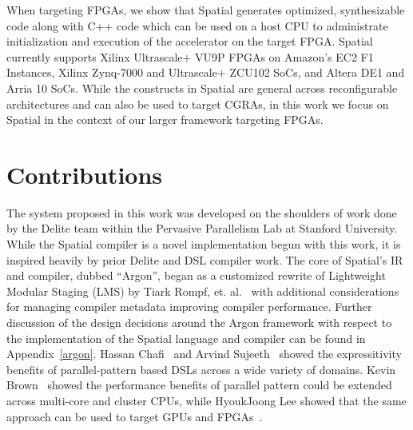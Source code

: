 When targeting FPGAs, we show that Spatial generates optimized, synthesizable
code along with C++ code which can be used on a host CPU to administrate
initialization and execution of the accelerator on the target FPGA.
Spatial currently supports Xilinx Ultrascale+ VU9P FPGAs on Amazon's
EC2 F1 Instances, Xilinx Zynq-7000 and Ultrascale+ ZCU102 SoCs, and Altera DE1 and Arria 10 SoCs.
While the constructs in Spatial are general across reconfigurable architectures
and can also be used to target CGRAs, in this work we focus on Spatial in the
context of our larger framework targeting FPGAs.

\section{Contributions}
The system proposed in this work was developed on the shoulders of work done by
the Delite team within the Pervasive Parallelism Lab at Stanford University.
While the Spatial compiler is a novel implementation begun with this work, it
is inspired heavily by prior Delite and DSL compiler work.
The core of Spatial's IR and compiler,
dubbed ``Argon'', began as a customized rewrite of Lightweight Modular Staging (LMS)
by Tiark Rompf, et. al.~\cite{tiark-thesis,lms} with additional considerations for managing
compiler metadata improving compiler performance.
Further discussion of the design decisions around the Argon framework with respect
to the implementation of the Spatial language and compiler can be found in Appendix~\ref{argon}.
Hassan Chafi~\cite{hassan-thesis} and
Arvind Sujeeth~\cite{arvind-thesis} showed the expressitivity benefits of
parallel-pattern based DSLs across a wide variety of domains.
Kevin Brown~\cite{kevin-thesis}
showed the performance benefits of parallel pattern
could be extended across multi-core and cluster CPUs, while
HyoukJoong Lee showed that the same approach can be used to target GPUs
and FPGAs~\cite{hj-thesis}.

